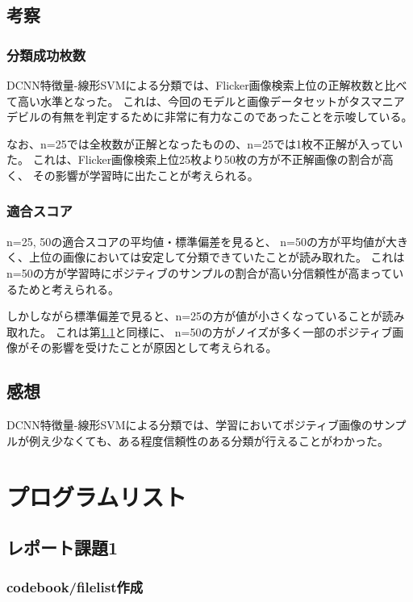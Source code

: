 \documentclass[11pt,a4paper, uplatex]{jsreport}
\begin{document}
\section{考察}
\subsection{分類成功枚数}\label{sec:analsuccess}
DCNN特徴量-線形SVMによる分類では、Flicker画像検索上位の正解枚数と比べて高い水準となった。
これは、今回のモデルと画像データセットがタスマニアデビルの有無を判定するために非常に有力なこのであったことを示唆している。

なお、n=25では全枚数が正解となったものの、n=25では1枚不正解が入っていた。
これは、Flicker画像検索上位25枚より50枚の方が不正解画像の割合が高く、
その影響が学習時に出たことが考えられる。

\subsection{適合スコア}
n=25, 50の適合スコアの平均値・標準偏差を見ると、
n=50の方が平均値が大きく、上位の画像においては安定して分類できていたことが読み取れた。
これはn=50の方が学習時にポジティブのサンプルの割合が高い分信頼性が高まっているためと考えられる。

しかしながら標準偏差で見ると、n=25の方が値が小さくなっていることが読み取れた。
これは第\ref{sec:analsuccess}と同様に、
n=50の方がノイズが多く一部のポジティブ画像がその影響を受けたことが原因として考えられる。
\section{感想}
DCNN特徴量-線形SVMによる分類では、学習においてポジティブ画像のサンプルが例え少なくても、ある程度信頼性のある分類が行えることがわかった。
\appendix
\chapter{プログラムリスト}
\section{レポート課題1}
\subsection{codebook/filelist作成}




\end{document}
